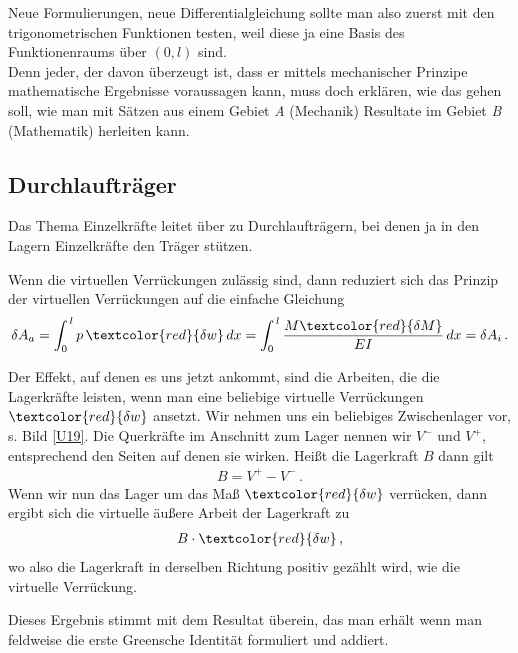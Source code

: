 Neue Formulierungen, neue Differentialgleichung sollte man also zuerst mit den trigonometrischen Funktionen testen, weil diese ja eine Basis des Funktionenraums \"{u}ber $(0,l)$ sind.
\\

Denn jeder, der davon \"{u}berzeugt ist, dass er mittels mechanischer Prinzipe mathematische Ergebnisse voraussagen kann, muss doch erkl\"{a}ren, wie das gehen soll, wie man mit S\"{a}tzen aus einem Gebiet {\em A\/} (Mechanik) Resultate im Gebiet {\em B\/} (Mathematik) herleiten kann.\\


{\textcolor{blau2}{\section{Durchlauftr\"{a}ger}}}
Das Thema Einzelkr\"{a}fte leitet \"{u}ber zu Durchlauftr\"{a}gern, bei denen ja in den Lagern Einzelkr\"{a}fte den Tr\"{a}ger st\"{u}tzen.

Wenn die virtuellen Verr\"{u}ckungen zul\"{a}ssig sind, dann reduziert sich das Prinzip der virtuellen Verr\"{u}ckungen auf die einfache Gleichung
\begin{align}
\delta A_a = \int_0^{\,l} p \,\textcolor{red}{\delta w}\,dx = \int_0^{\,l} \frac{M \textcolor{red}{\delta M}}{EI}\,dx = \delta A_i\,.
\end{align}


Der Effekt, auf denen es uns jetzt ankommt, sind die Arbeiten, die die Lagerkr\"{a}fte leisten, wenn man eine beliebige virtuelle Verr\"{u}ckungen $ \textcolor{red}{\delta w}$ ansetzt. Wir nehmen uns ein beliebiges Zwischenlager vor, s. Bild \ref{U19}. Die Querkr\"{a}fte im Anschnitt zum Lager nennen wir $V^-$ und $V^+$, entsprechend den Seiten auf denen sie wirken. Hei{\ss}t die Lagerkraft $B$ dann gilt
\begin{align}
B  = V^+ - V^-\,.
\end{align}
Wenn wir nun das Lager  um das Ma{\ss} $\textcolor{red}{\delta w} $ verr\"{u}cken, dann ergibt sich die virtuelle \"{a}u{\ss}ere Arbeit der Lagerkraft zu
\begin{align}
B \cdot \textcolor{red}{\delta w}\,,
\end{align}
wo also die Lagerkraft in derselben Richtung positiv gez\"{a}hlt wird, wie die virtuelle Verr\"{u}ckung.

Dieses Ergebnis stimmt mit dem Resultat \"{u}berein, das man erh\"{a}lt wenn man feldweise die erste Greensche Identit\"{a}t formuliert und addiert.
\\

